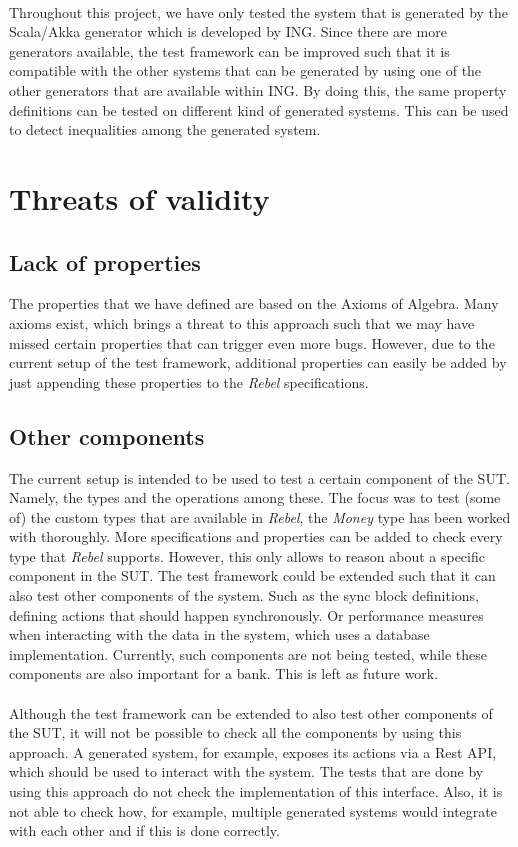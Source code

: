 \\
Throughout this project, we have only tested the system that is generated by the Scala/Akka generator which is developed by ING. Since there are more generators available, the test framework can be improved such that it is compatible with the other systems that can be generated by using one of the other generators that are available within ING. By doing this, the same property definitions can be tested on different kind of generated systems. This can be used to detect inequalities among the generated system.

\section{Threats of validity}

\subsection*{Lack of properties}
The properties that we have defined are based on the Axioms of Algebra. Many axioms exist, which brings a threat to this approach such that we may have missed certain properties that can trigger even more bugs. However, due to the current setup of the test framework, additional properties can easily be added by just appending these properties to the \textit{Rebel} specifications.

\subsection*{Other components}
The current setup is intended to be used to test a certain component of the SUT. Namely, the types and the operations among these. The focus was to test (some of) the custom types that are available in \textit{Rebel}, the \textit{Money} type has been worked with thoroughly. More specifications and properties can be added to check every type that \textit{Rebel} supports. However, this only allows to reason about a specific component in the SUT. The test framework could be extended such that it can also test other components of the system. Such as the sync block definitions, defining actions that should happen synchronously. Or performance measures when interacting with the data in the system, which uses a database implementation. Currently, such components are not being tested, while these components are also important for a bank. This is left as future work.\\
\\
Although the test framework can be extended to also test other components of the SUT, it will not be possible to check all the components by using this approach. A generated system, for example, exposes its actions via a Rest API, which should be used to interact with the system. The tests that are done by using this approach do not check the implementation of this interface. Also, it is not able to check how, for example, multiple generated systems would integrate with each other and if this is done correctly.

